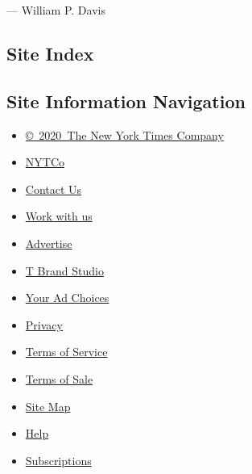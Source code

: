 --- William P. Davis

\hypertarget{site-index}{%
\subsection{Site Index}\label{site-index}}

\hypertarget{site-information-navigation}{%
\subsection{Site Information
Navigation}\label{site-information-navigation}}

\begin{itemize}
\tightlist
\item
  \href{https://help.nytimes3xbfgragh.onion/hc/en-us/articles/115014792127-Copyright-notice}{©~2020~The
  New York Times Company}
\end{itemize}

\begin{itemize}
\tightlist
\item
  \href{https://www.nytco.com/}{NYTCo}
\item
  \href{https://help.nytimes3xbfgragh.onion/hc/en-us/articles/115015385887-Contact-Us}{Contact
  Us}
\item
  \href{https://www.nytco.com/careers/}{Work with us}
\item
  \href{https://nytmediakit.com/}{Advertise}
\item
  \href{http://www.tbrandstudio.com/}{T Brand Studio}
\item
  \href{https://www.nytimes3xbfgragh.onion/privacy/cookie-policy\#how-do-i-manage-trackers}{Your
  Ad Choices}
\item
  \href{https://www.nytimes3xbfgragh.onion/privacy}{Privacy}
\item
  \href{https://help.nytimes3xbfgragh.onion/hc/en-us/articles/115014893428-Terms-of-service}{Terms
  of Service}
\item
  \href{https://help.nytimes3xbfgragh.onion/hc/en-us/articles/115014893968-Terms-of-sale}{Terms
  of Sale}
\item
  \href{https://spiderbites.nytimes3xbfgragh.onion}{Site Map}
\item
  \href{https://help.nytimes3xbfgragh.onion/hc/en-us}{Help}
\item
  \href{https://www.nytimes3xbfgragh.onion/subscription?campaignId=37WXW}{Subscriptions}
\end{itemize}
